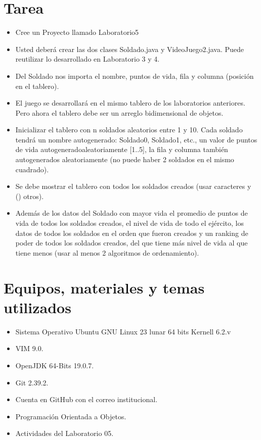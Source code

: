 \documentclass{article}
\begin{document}
	\section{Tarea}
	\begin{itemize}		
        \item Cree un Proyecto llamado Laboratorio5
		\item Usted deberá crear las dos clases Soldado.java y VideoJuego2.java. Puede reutilizar lo desarrollado en Laboratorio 3 y 4.
		\item Del Soldado nos importa el nombre, puntos de vida, fila y columna (posición en el tablero).
		\item El juego se desarrollará en el mismo tablero de los laboratorios anteriores. Pero ahora el tablero debe ser un arreglo bidimensional de objetos.
		\item Inicializar el tablero con n soldados aleatorios entre 1 y 10. Cada soldado tendrá un nombre autogenerado: Soldado0, Soldado1, etc., un valor de puntos de vida autogeneradoaleatoriamente [1..5], la fila y columna también autogenerados aleatoriamente (no puede haber 2 soldados en el mismo cuadrado). 
		\item Se debe mostrar el tablero con todos los soldados creados (usar caracteres y () otros).
		\item Además de los datos del Soldado con mayor vida el promedio de puntos de vida de todos los soldados creados, el nivel de vida de todo el ejército, los datos de todos los soldados en el orden que fueron creados y un ranking de poder de todos los soldados creados, del que tiene más nivel de vida al que tiene menos (usar al menos 2 algoritmos de ordenamiento).
	\end{itemize}

	\section{Equipos, materiales y temas utilizados}
	\begin{itemize}
		\item Sistema Operativo Ubuntu GNU Linux 23 lunar 64 bits Kernell 6.2.v
		\item VIM 9.0.
		\item OpenJDK 64-Bits 19.0.7.
		\item Git 2.39.2.
		\item Cuenta en GitHub con el correo institucional.
		\item Programación Orientada a Objetos.
		\item Actividades del Laboratorio 05.	
	\end{itemize}
	
\end{document}

